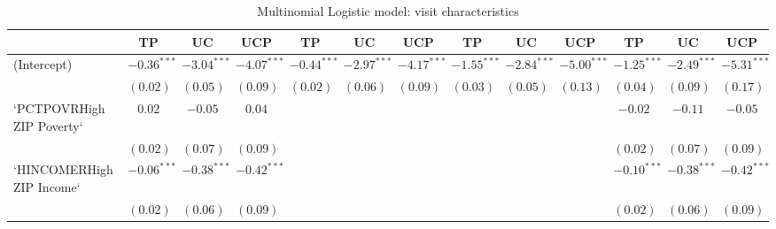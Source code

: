 \documentclass[12pt,twoside]{reedthesis}
\begin{document}
  \begin{table}
  \caption{Multinomial Logistic model: visit characteristics}
  \begin{center}
  \begin{tiny}
  \begin{tabular}{l@{} c@{} c@{} c@{} c@{} c@{} c@{} c@{} c@{} c@{} c@{} c@{} c@{} }
  \toprule
   & TP & UC & UCP & TP & UC & UCP & TP & UC & UCP & TP & UC & UCP \\
  \midrule
  (Intercept)                        & $\mathbf{-0.36}^{***}$ & $\mathbf{-3.04}^{***}$ & $\mathbf{-4.07}^{***}$ & $\mathbf{-0.44}^{***}$ & $\mathbf{-2.97}^{***}$ & $\mathbf{-4.17}^{***}$ & $\mathbf{-1.55}^{***}$ & $\mathbf{-2.84}^{***}$ & $\mathbf{-5.00}^{***}$ & $\mathbf{-1.25}^{***}$ & $\mathbf{-2.49}^{***}$ & $\mathbf{-5.31}^{***}$ \\
                                     & $(0.02)$               & $(0.05)$               & $(0.09)$               & $(0.02)$               & $(0.06)$               & $(0.09)$               & $(0.03)$               & $(0.05)$               & $(0.13)$               & $(0.04)$               & $(0.09)$               & $(0.17)$               \\
  `PCTPOVRHigh ZIP Poverty`          & $0.02$                 & $-0.05$                & $0.04$                 &                        &                        &                        &                        &                        &                        & $-0.02$                & $-0.11$                & $-0.05$                \\
                                     & $(0.02)$               & $(0.07)$               & $(0.09)$               &                        &                        &                        &                        &                        &                        & $(0.02)$               & $(0.07)$               & $(0.09)$               \\
  `HINCOMERHigh ZIP Income`          & $\mathbf{-0.06}^{***}$ & $\mathbf{-0.38}^{***}$ & $\mathbf{-0.42}^{***}$ &                        &                        &                        &                        &                        &                        & $\mathbf{-0.10}^{***}$ & $\mathbf{-0.38}^{***}$ & $\mathbf{-0.42}^{***}$ \\
                                     & $(0.02)$               & $(0.06)$               & $(0.09)$               &                        &                        &                        &                        &                        &                        & $(0.02)$               & $(0.06)$               & $(0.09)$               \\

\end{tabular}
\end{tiny}
\end{center}
\end{table}
\end{document}
